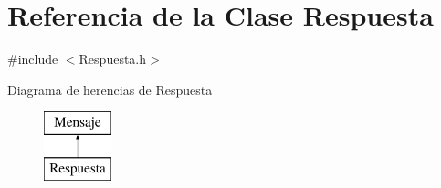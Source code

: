 \hypertarget{classRespuesta}{\section{\-Referencia de la \-Clase \-Respuesta}
\label{classRespuesta}
}


{\ttfamily \#include $<$\-Respuesta.\-h$>$}

\-Diagrama de herencias de \-Respuesta\begin{figure}[H]
\begin{center}
\leavevmode
\includegraphics[height=2.000000cm]{classRespuesta}
\end{center}
\end{figure}
